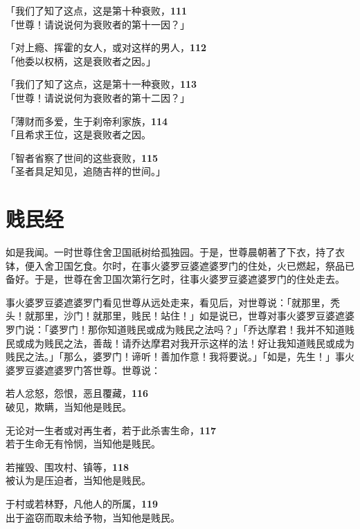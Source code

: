 「我们了知了这点，这是第十种衰败，\hfill{\grayfootnotesize \textbf{111}} \\
「世尊！请说说何为衰败者的第十一因？」

「对上瘾、挥霍的女人，或对这样的男人，\hfill{\grayfootnotesize \textbf{112}} \\
「他委以权柄，这是衰败者之因。」


「我们了知了这点，这是第十一种衰败，\hfill{\grayfootnotesize \textbf{113}} \\
「世尊！请说说何为衰败者的第十二因？」

「薄财而多爱，生于刹帝利家族，\hfill{\grayfootnotesize \textbf{114}} \\
「且希求王位，这是衰败者之因。


「智者省察了世间的这些衰败，\hfill{\grayfootnotesize \textbf{115}} \\
「圣者具足知见，追随吉祥的世间。」


\section{贱民经}

如是我闻。一时世尊住舍卫国祇树给孤独园。于是，世尊晨朝著了下衣，持了衣钵，便入舍卫国乞食。尔时，在事火婆罗豆婆遮婆罗门的住处，火已燃起，祭品已备好。于是，世尊在舍卫国次第行乞时，往事火婆罗豆婆遮婆罗门的住处走去。


事火婆罗豆婆遮婆罗门看见世尊从远处走来，看见后，对世尊说：「就那里，秃头！就那里，沙门！就那里，贱民！站住！」如是说已，世尊对事火婆罗豆婆遮婆罗门说：「婆罗门！那你知道贱民或成为贱民之法吗？」「乔达摩君！我并不知道贱民或成为贱民之法，善哉！请乔达摩君对我开示这样的法！好让我知道贱民或成为贱民之法。」「那么，婆罗门！谛听！善加作意！我将要说。」「如是，先生！」事火婆罗豆婆遮婆罗门答世尊。世尊说：


若人忿怒，怨恨，恶且覆藏，\hfill{\grayfootnotesize \textbf{116}} \\
破见，欺瞒，当知他是贱民。


无论对一生者或对再生者，若于此杀害生命，\hfill{\grayfootnotesize \textbf{117}} \\
若于生命无有怜悯，当知他是贱民。


若摧毁、围攻村、镇等，\hfill{\grayfootnotesize \textbf{118}} \\
被认为是压迫者，当知他是贱民。


于村或若林野，凡他人的所属，\hfill{\grayfootnotesize \textbf{119}} \\
出于盗窃而取未给予物，当知他是贱民。


